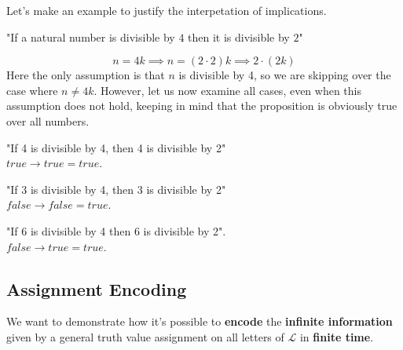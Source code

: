 		\begin{example} Let's make an example to justify the interpetation of implications.
		\begin{center}
		  "If a natural number is divisible by $4$ then it is divisible by $2$"
		\end{center}
		$$ n = 4k \implies n = (2 \cdot 2) k \implies 2 \cdot (2k) $$
		Here the only assumption is that $n$ is divisible by 4, so we are skipping over the case where $n \neq 4k$. However, let us now examine all cases, even when this assumption does not hold, keeping in mind  that the proposition is obviously true over all numbers.

		\begin{center}
		"If 4 is divisible by 4, then 4 is divisible by 2"\\
		$true \rightarrow true = true$.
	  \end{center}

	  \begin{center}
		"If 3 is divisible by 4, then 3 is divisible by 2"\\
		$false \rightarrow false = true$.
	  \end{center}

	  \begin{center}
		"If 6 is divisible by 4 then 6 is divisible by 2". \\
		$false \rightarrow true = true$.
	  \end{center}
	\end{example}

	\subsection{Assignment Encoding}

	We want to demonstrate how it's possible to \textbf{encode} the \textbf{infinite information} given by a general truth value assignment on all letters of $\mathcal{L}$ in \textbf{finite time}.


